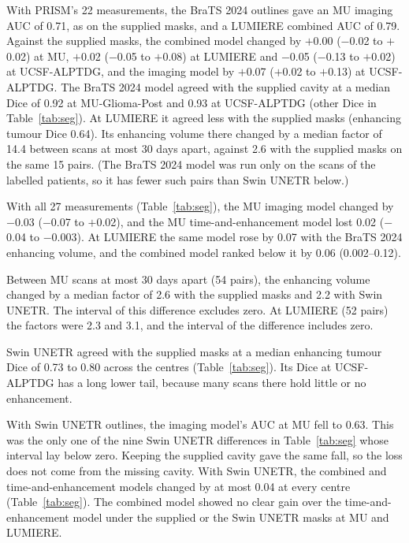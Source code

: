 \documentclass[largeformat]{interact} %
\begin{document}
With PRISM's 22 measurements, the BraTS 2024 outlines gave an MU imaging AUC of 0.71, as on the supplied masks, and a
LUMIERE combined AUC of 0.79. Against the supplied masks, the combined model changed by $+$0.00 ($-$0.02 to $+$0.02) at
MU, $+$0.02 ($-$0.05 to $+$0.08) at LUMIERE and $-$0.05 ($-$0.13 to $+$0.02) at UCSF-ALPTDG, and the imaging model by
$+$0.07 ($+$0.02 to $+$0.13) at UCSF-ALPTDG. The BraTS 2024 model agreed with the supplied cavity at a median Dice of 0.92 at
MU-Glioma-Post and 0.93 at UCSF-ALPTDG (other Dice in Table~\ref{tab:seg}). At LUMIERE it agreed less with the
supplied masks (enhancing tumour Dice 0.64). Its enhancing volume there changed by a median factor of 14.4 between
scans at most 30 days apart, against 2.6 with the supplied masks on the same 15 pairs. (The BraTS 2024 model was run only on the scans of the
labelled patients, so it has fewer such pairs than Swin UNETR below.)

With all 27 measurements (Table~\ref{tab:seg}), the MU imaging model changed by $-$0.03 ($-$0.07 to $+$0.02), and the
MU time-and-enhancement model lost 0.02 ($-$0.04 to $-$0.003). At LUMIERE the same model rose by 0.07 with the BraTS
2024 enhancing volume, and the combined model ranked below it by 0.06 (0.002--0.12).

Between MU scans at most 30 days apart (54 pairs), the enhancing volume changed by a median factor of 2.6 with the
supplied masks and 2.2 with Swin UNETR. The interval of this difference excludes zero. At LUMIERE (52 pairs) the
factors were 2.3 and 3.1, and the interval of the difference includes zero.

Swin UNETR agreed with the supplied masks at a median enhancing tumour Dice of 0.73 to 0.80 across the centres
(Table~\ref{tab:seg}). Its Dice at UCSF-ALPTDG has a long lower tail, because many scans there hold little or no
enhancement.

With Swin UNETR outlines, the imaging model's AUC at MU fell to 0.63. This was the only one of the nine Swin UNETR
differences in Table~\ref{tab:seg} whose interval lay below zero. Keeping the supplied cavity gave the same fall, so
the loss does not come from the missing cavity. With Swin UNETR, the combined and time-and-enhancement models changed by at most 0.04 at every centre
(Table~\ref{tab:seg}). The combined model showed no clear gain over the time-and-enhancement model
under the supplied or the Swin UNETR masks at MU and LUMIERE.
\end{document}
